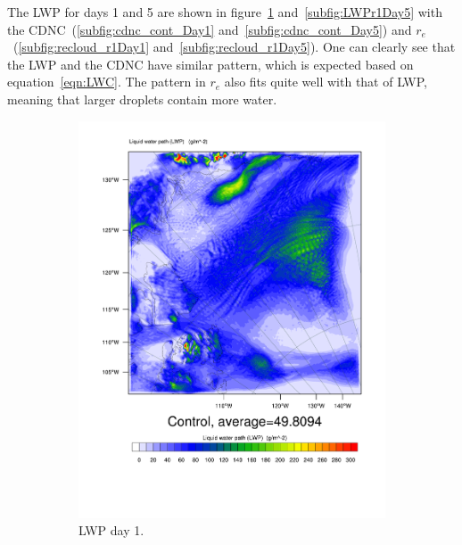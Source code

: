 The LWP for days 1 and 5 are shown in figure~\ref{subfig:LWPr1Day1} and~\ref{subfig:LWPr1Day5} with the CDNC~(\ref{subfig:cdnc_cont_Day1} and~\ref{subfig:cdnc_cont_Day5}) and $r_e$~(\ref{subfig:recloud_r1Day1} and~\ref{subfig:recloud_r1Day5}). One can clearly see that the LWP and the CDNC have similar pattern, which is expected based on equation~\ref{eqn:LWC}. The pattern in $r_e$ also fits quite well with that of LWP, meaning that larger droplets contain more water.

\begin{figure}
    \centering
    \begin{subfigure}{0.40\textwidth}
        \centering
        \includegraphics[width=\textwidth]{results/control/LWP_Day1.pdf}
        \caption{LWP day 1.}
        \label{subfig:LWPr1Day1}
    \end{subfigure}
    \begin{subfigure}{0.40\textwidth}
        \centering

\end{subfigure}
\end{figure}
